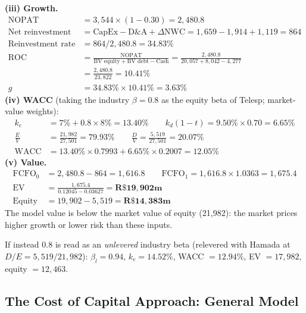 \begin{exbox}
\textbf{(iii) Growth.}
\begin{align*}
\text{NOPAT} &= 3{,}544\times(1-0.30) = 2{,}480.8\\
\text{Net reinvestment} &= \text{CapEx}-\text{D\&A}+\Delta\text{NWC} = 1{,}659-1{,}914+1{,}119 = 864\\
\text{Reinvestment rate} &= 864/2{,}480.8 = 34.83\%\\
\text{ROC} &= \frac{\text{NOPAT}}{\text{BV equity}+\text{BV debt}-\text{Cash}} = \frac{2{,}480.8}{20{,}057+8{,}042-4{,}277}\\
&= \frac{2{,}480.8}{23{,}822} = 10.41\%\\
g &= 34.83\%\times10.41\% = \mathbf{3.63\%}
\end{align*}
\textbf{(iv) WACC} (taking the industry $\beta=0.8$ as the equity beta of Telesp; market-value weights):
\begin{align*}
k_e &= 7\%+0.8\times8\% = 13.40\%\qquad k_d(1-t) = 9.50\%\times0.70 = 6.65\%\\
\tfrac{E}{V} &= \tfrac{21{,}982}{27{,}501}=79.93\%\qquad \tfrac{D}{V}=\tfrac{5{,}519}{27{,}501}=20.07\%\\
\text{WACC} &= 13.40\%\times0.7993+6.65\%\times0.2007 = \mathbf{12.05\%}
\end{align*}
\textbf{(v) Value.}
\begin{align*}
\text{FCFO}_0 &= 2{,}480.8-864 = 1{,}616.8\qquad \text{FCFO}_1 = 1{,}616.8\times1.0363 = 1{,}675.4\\
\text{EV} &= \frac{1{,}675.4}{0.12045-0.03627} = \mathbf{R\$19{,}902m}\\
\text{Equity} &= 19{,}902-5{,}519 = \mathbf{R\$14{,}383m}
\end{align*}
The model value is below the market value of equity (21,982): the market prices higher growth or lower risk than these inputs.\par
\footnotesize If instead $0.8$ is read as an \emph{unlevered} industry beta (relevered with Hamada at $D/E=5{,}519/21{,}982$): $\beta_l=0.94$, $k_e=14.52\%$, WACC $=12.94\%$, EV $=17{,}982$, equity $=12{,}463$.
\end{exbox}

\subsection[The Cost of Capital Approach: General Model]{The Cost of Capital Approach: General Model }

